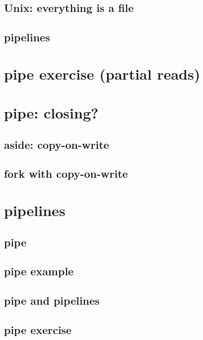 

\subsection{Unix: everything is a file}



\subsection{pipelines}


\section{pipe exercise (partial reads)}

\section{pipe: closing?}



\subsection{aside: copy-on-write}


\subsection{fork with copy-on-write}



\section{pipelines}

\subsection{pipe}



\subsection{pipe example}


\subsection{pipe and pipelines}


\subsection{pipe exercise}
